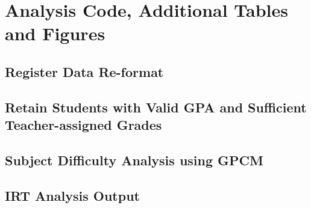 \section{Analysis Code, Additional Tables and Figures}\label{app}

\subsection{Register Data Re-format}

\begin{singlespacing}
    
\end{singlespacing}

\subsection{Retain Students with Valid GPA and Sufficient Teacher-assigned Grades}

\begin{singlespacing}
    
\end{singlespacing}

\subsection{Subject Difficulty Analysis using GPCM}

\begin{singlespacing}
    
\end{singlespacing}

\newpage

\subsection{IRT Analysis Output}





\newpage
